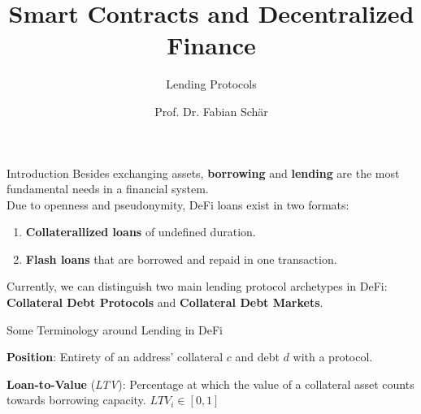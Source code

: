 \documentclass[handout]{beamer}
\title{Smart Contracts and Decentralized Finance}
\subtitle{Lending Protocols}
\author{Prof. Dr. Fabian Schär}
\institute{University of Basel}
\begin{document}
\thispagestyle{empty}
\begin{frame}[noframenumbering]
	\titlepage
\end{frame}

\begin{frame}{Introduction}
Besides exchanging assets, \textbf{borrowing} and \textbf{lending} are the most fundamental needs in a financial system. \\

\vspace{1em}
Due to openness and pseudonymity, DeFi loans exist in two formats:
\vspace{0.5em}
\begin{enumerate}
  \item \textbf{Collaterallized loans} of undefined duration.
  \item \textbf{Flash loans} that are borrowed and repaid in one transaction. 
\end{enumerate} 

\vspace{1em}
Currently, we can distinguish two main lending protocol archetypes in DeFi: \textbf{Collateral Debt Protocols} and \textbf{Collateral Debt Markets}.
	
\end{frame}


\begin{frame}{Some Terminology around Lending in DeFi}

\vspace{1em}

\textbf{Position}: Entirety of an address' collateral $c$ and debt $d$ with a protocol.
			
\vspace{1.0em}
			
 {
\textbf{Loan-to-Value} (\textit{LTV}): Percentage at which the value of a collateral asset counts towards borrowing capacity. $LTV_i \in [0,1]$
}

\vspace{1.0em}



\end{frame}
\end{document}
